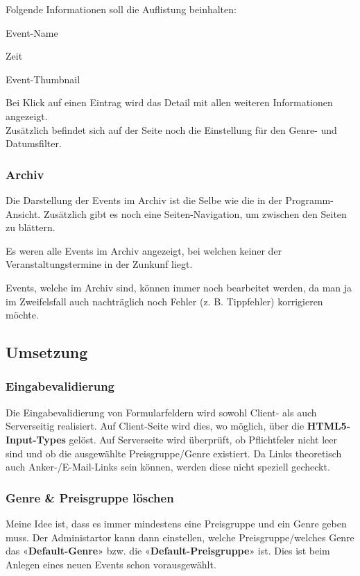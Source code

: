 \documentclass[11pt,a4paper,titlepage,portrait,ngerman]{scrartcl}
\begin{document}
\noindent
Folgende Informationen soll die Auflistung beinhalten:

\begin{list}{\textendash}{}
	\item{Event-Name}
	\item{Zeit}
	\item{Event-Thumbnail}
\end{list}

\noindent
Bei Klick auf einen Eintrag wird das Detail mit allen weiteren Informationen angezeigt.
\\

\noindent
Zusätzlich befindet sich auf der Seite noch die Einstellung für den Genre- und Datumsfilter.

\subsubsection*{Archiv}
Die Darstellung der Events im Archiv ist die Selbe wie die in der Programm-Ansicht. Zusätzlich gibt es noch eine Seiten-Navigation, um zwischen den Seiten zu blättern.

Es weren alle Events im Archiv angezeigt, bei welchen keiner der Veranstaltungstermine in der Zunkunf liegt. 

Events, welche im Archiv sind, können immer noch bearbeitet werden, da man ja im Zweifelsfall auch nachträglich noch Fehler (z. B. Tippfehler) korrigieren möchte.


\subsection{Umsetzung}
\subsubsection*{Eingabevalidierung}
Die Eingabevalidierung von Formularfeldern wird sowohl Client- als auch Serverseitig realisiert. 
Auf Client-Seite wird dies, wo möglich, über die \textbf{HTML5-Input-Types} gelöst. Auf Serverseite wird überprüft, ob Pflichtfeler nicht leer sind und ob die ausgewählte Preisgruppe/Genre existiert.
Da Links theoretisch auch Anker-/E-Mail-Links sein können, werden diese nicht speziell gecheckt.

\subsubsection*{Genre \& Preisgruppe löschen}
Meine Idee ist, dass es immer mindestens eine Preisgruppe und ein Genre geben muss.
Der Administartor kann dann einstellen, welche Preisgruppe/welches Genre das «\textbf{Default-Genre}» bzw. die «\textbf{Default-Preisgruppe}» ist. Dies ist beim Anlegen eines neuen Events schon vorausgewählt. 
\\
\end{document}
